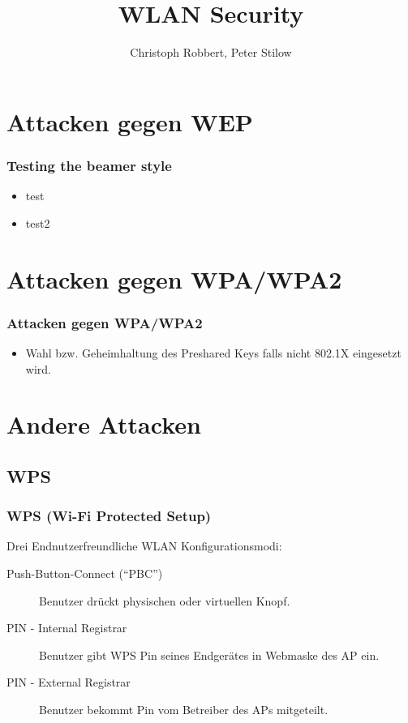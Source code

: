 \documentclass{beamer}
\author[C.Robbert, P. Stilow]{Christoph Robbert, Peter Stilow}
\institute[Uni Paderborn]{Universität Paderborn}
\title[WLAN Security]{WLAN Security}
\begin{document}
\begin{frame}
\maketitle
\end{frame}
\section{Attacken gegen WEP}
\begin{frame}
\frametitle{Testing the beamer style}
\begin{itemize}
	\item test
	\item test2
\end{itemize}
\end{frame}

\section{Attacken gegen WPA/WPA2}
\begin{frame}
\frametitle{Attacken gegen WPA/WPA2}
\begin{itemize}
	\item Wahl bzw. Geheimhaltung des Preshared Keys falls nicht 802.1X eingesetzt wird.
\end{itemize}
\end{frame}

\section{Andere Attacken}
\subsection{WPS}
\begin{frame}
\frametitle{WPS (Wi-Fi Protected Setup)}
Drei Endnutzerfreundliche WLAN Konfigurationsmodi:
\begin{description}
	\item[Push-Button-Connect (“PBC”)] Benutzer drückt physischen oder virtuellen Knopf.
	\item[PIN - Internal Registrar] Benutzer gibt WPS Pin seines Endgerätes in Webmaske des AP ein.
	\item[PIN - External Registrar] Benutzer bekommt Pin vom Betreiber des APs mitgeteilt.
\end{description}
\end{frame}
\end{document}
